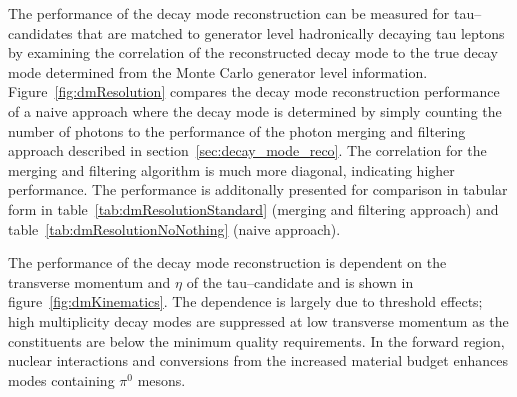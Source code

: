 The performance of the decay mode reconstruction can be measured for
tau--candidates that are matched to generator level hadronically decaying tau
leptons by examining the correlation of the reconstructed decay mode to the true
decay mode determined from the Monte Carlo generator level information.
Figure~\ref{fig:dmResolution} compares the decay mode reconstruction performance
of a naive approach where the decay mode is determined by simply counting the
number of photons to the performance of the photon merging and filtering
approach described in section~\ref{sec:decay_mode_reco}.  The correlation for
the merging and filtering algorithm is much more diagonal, indicating higher
performance.  The performance is additonally presented for comparison in tabular form in
table~\ref{tab:dmResolutionStandard} (merging and filtering approach) and
table~\ref{tab:dmResolutionNoNothing} (naive approach).

The performance of the decay mode reconstruction is dependent on the transverse
momentum and $\eta$ of the tau--candidate and is shown in
figure~\ref{fig:dmKinematics}.  The \pt dependence is largely due to
threshold effects; high multiplicity decay modes are suppressed at low
transverse momentum as the constituents are below the minimum \pt quality
requirements.  In the forward region, nuclear interactions and conversions from
the increased material budget enhances modes containing $\pi^0$ mesons.




